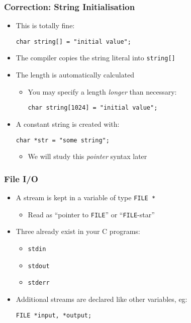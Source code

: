 \documentclass[14pt]{beamer}
\begin{document}
\begin{frame}[fragile]
\frametitle{Correction: String Initialisation}
\begin{itemize}
\item This is totally fine:
\begin{lstlisting}[style=CStyle]
char string[] = "initial value";
\end{lstlisting}
\item The compiler copies the string literal into \texttt{string[]}
\item The length is automatically calculated
	\begin{itemize}
		\item You may specify a length \textit{longer} than necessary:
\begin{lstlisting}[style=CStyle]
char string[1024] = "initial value";			
\end{lstlisting}
	\end{itemize}
\pause
\item A constant string is created with:
\begin{lstlisting}[style=CStyle]
char *str = "some string";
\end{lstlisting}
	\begin{itemize}
		\item We will study this \textit{pointer} syntax later
	\end{itemize}
\end{itemize}
\end{frame}

\begin{frame}[fragile]
\frametitle{File I/O}
\begin{itemize}
\item A stream is kept in a variable of type \texttt{FILE~*}
	\begin{itemize}
		\item Read as ``pointer to \texttt{FILE}'' or ``\texttt{FILE}-star''
	\end{itemize}
\item Three already exist in your C programs:
	\begin{itemize}
		\item \texttt{stdin}
		\item \texttt{stdout}
		\item \texttt{stderr}
	\end{itemize}
\item Additional streams are declared like other variables, eg:
\begin{lstlisting}[style=CStyle]
FILE *input, *output;
\end{lstlisting}
\end{itemize}
\end{frame}
\end{document}
